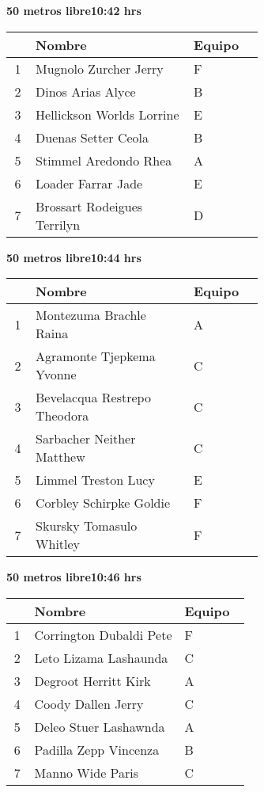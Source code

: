 \begin{minipage}{0.95\linewidth}
\begin{center}
\textbf{
50 metros libre\hspace{1cm}10:42 hrs}
\end{center}
\begin{tabular}{cp{0.63\linewidth}l}
\hline
& \textbf{Nombre} & \textbf{Equipo} \\ \hline
1 & Mugnolo Zurcher Jerry & F \\ 
2 & Dinos Arias Alyce & B \\ 
3 & Hellickson Worlds Lorrine & E \\ 
4 & Duenas Setter Ceola & B \\ 
5 & Stimmel Aredondo Rhea & A \\ 
6 & Loader Farrar Jade & E \\ 
7 & Brossart Rodeigues Terrilyn & D \\ 
\end{tabular}
\end{minipage}
\begin{minipage}{0.95\linewidth}
\begin{center}
\textbf{
50 metros libre\hspace{1cm}10:44 hrs}
\end{center}
\begin{tabular}{cp{0.63\linewidth}l}
\hline
& \textbf{Nombre} & \textbf{Equipo} \\ \hline
1 & Montezuma Brachle Raina & A \\ 
2 & Agramonte Tjepkema Yvonne & C \\ 
3 & Bevelacqua Restrepo Theodora & C \\ 
4 & Sarbacher Neither Matthew & C \\ 
5 & Limmel Treston Lucy & E \\ 
6 & Corbley Schirpke Goldie & F \\ 
7 & Skursky Tomasulo Whitley & F \\ 
\end{tabular}
\end{minipage}
\begin{minipage}{0.95\linewidth}
\begin{center}
\textbf{
50 metros libre\hspace{1cm}10:46 hrs}
\end{center}
\begin{tabular}{cp{0.63\linewidth}l}
\hline
& \textbf{Nombre} & \textbf{Equipo} \\ \hline
1 & Corrington Dubaldi Pete & F \\ 
2 & Leto Lizama Lashaunda & C \\ 
3 & Degroot Herritt Kirk & A \\ 
4 & Coody Dallen Jerry & C \\ 
5 & Deleo Stuer Lashawnda & A \\ 
6 & Padilla Zepp Vincenza & B \\ 
7 & Manno Wide Paris & C \\ 
\end{tabular}
\end{minipage}
